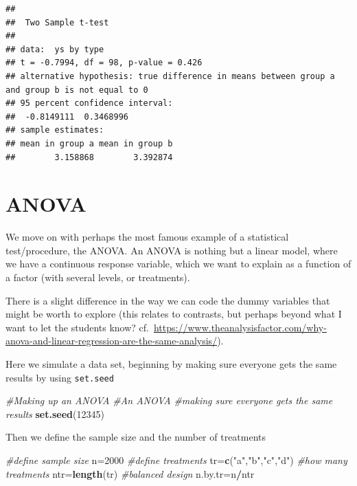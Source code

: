\documentclass[
]{book}
\newenvironment{Shaded}{\begin{snugshade}}{\end{snugshade}}
\newcommand{\CommentTok}[1]{\textcolor[rgb]{0.56,0.35,0.01}{\textit{#1}}}
\newcommand{\DecValTok}[1]{\textcolor[rgb]{0.00,0.00,0.81}{#1}}
\newcommand{\FunctionTok}[1]{\textcolor[rgb]{0.13,0.29,0.53}{\textbf{#1}}}
\newcommand{\NormalTok}[1]{#1}
\newcommand{\OtherTok}[1]{\textcolor[rgb]{0.56,0.35,0.01}{#1}}
\newcommand{\SpecialCharTok}[1]{\textcolor[rgb]{0.81,0.36,0.00}{\textbf{#1}}}
\newcommand{\StringTok}[1]{\textcolor[rgb]{0.31,0.60,0.02}{#1}}
\begin{document}
\begin{verbatim}
## 
##  Two Sample t-test
## 
## data:  ys by type
## t = -0.7994, df = 98, p-value = 0.426
## alternative hypothesis: true difference in means between group a and group b is not equal to 0
## 95 percent confidence interval:
##  -0.8149111  0.3468996
## sample estimates:
## mean in group a mean in group b 
##        3.158868        3.392874
\end{verbatim}

\hypertarget{anova}{%
\section{ANOVA}\label{anova}}

We move on with perhaps the most famous example of a statistical test/procedure, the ANOVA. An ANOVA is nothing but a linear model, where we have a continuous response variable, which we want to explain as a function of a factor (with several levels, or treatments).

There is a slight difference in the way we can code the dummy variables that might be worth to explore (this relates to contrasts, but perhaps beyond what I want to let the students know? cf.~\url{https://www.theanalysisfactor.com/why-anova-and-linear-regression-are-the-same-analysis/}).

Here we simulate a data set, beginning by making sure everyone gets the same results by using \texttt{set.seed}

\begin{Shaded}
\begin{Highlighting}[]
\CommentTok{\#Making up an ANOVA}
\CommentTok{\#An ANOVA}
\CommentTok{\#making sure everyone gets the same results}
\FunctionTok{set.seed}\NormalTok{(}\DecValTok{12345}\NormalTok{)}
\end{Highlighting}
\end{Shaded}

Then we define the sample size and the number of treatments

\begin{Shaded}
\begin{Highlighting}[]
\CommentTok{\#define sample size}
\NormalTok{n}\OtherTok{=}\DecValTok{2000}
\CommentTok{\#define treatments}
\NormalTok{tr}\OtherTok{=}\FunctionTok{c}\NormalTok{(}\StringTok{"a"}\NormalTok{,}\StringTok{"b"}\NormalTok{,}\StringTok{"c"}\NormalTok{,}\StringTok{"d"}\NormalTok{)}
\CommentTok{\#how many treatments}
\NormalTok{ntr}\OtherTok{=}\FunctionTok{length}\NormalTok{(tr)}
\CommentTok{\#balanced design}
\NormalTok{n.by.tr}\OtherTok{=}\NormalTok{n}\SpecialCharTok{/}\NormalTok{ntr}
\end{Highlighting}
\end{Shaded}
\end{document}

